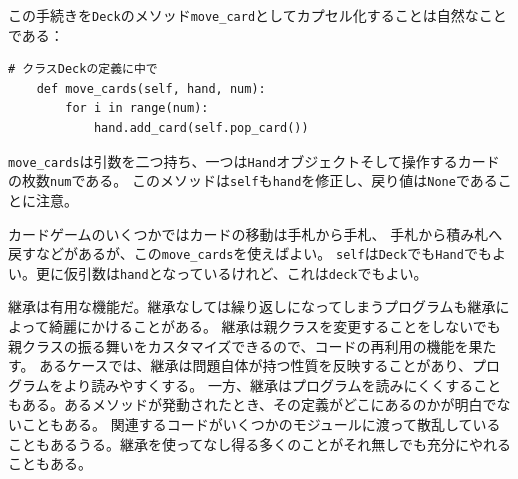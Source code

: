 \documentclass[a4j,12pt,makeidx]{jbook}
\begin{document}
この手続きを{\tt Deck}のメソッド{\tt move\_card}としてカプセル化することは自然なことである：
\begin{verbatim}
# クラスDeckの定義に中で
    def move_cards(self, hand, num):
        for i in range(num):
            hand.add_card(self.pop_card())
\end{verbatim}
{\tt move\_cards}は引数を二つ持ち、一つは{\tt Hand}オブジェクトそして操作するカードの枚数{\tt num}である。
このメソッドは{\tt self}も{\tt hand}を修正し、戻り値は{\tt None}であることに注意。\par
カードゲームのいくつかではカードの移動は手札から手札、
手札から積み札へ戻すなどがあるが、この{\tt move\_cards}を使えばよい。
{\tt self}は{\tt Deck}でも{\tt Hand}でもよい。更に仮引数は{\tt hand}となっているけれど、これは{\tt deck}でもよい。\par
継承は有用な機能だ。継承なしては繰り返しになってしまうプログラムも継承によって綺麗にかけることがある。
継承は親クラスを変更することをしないでも親クラスの振る舞いをカスタマイズできるので、コードの再利用の機能を果たす。
あるケースでは、継承は問題自体が持つ性質を反映することがあり、プログラムをより読みやすくする。
一方、継承はプログラムを読みにくくすることもある。あるメソッドが発動されたとき、その定義がどこにあるのかが明白でないこともある。
関連するコードがいくつかのモジュールに渡って散乱していることもあるうる。継承を使ってなし得る多くのことがそれ無しでも充分にやれることもある。
%
\end{document}
